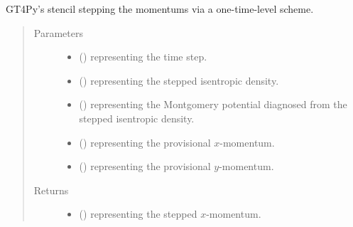 \documentclass[letterpaper,10pt,english]{sphinxmanual}
\begin{document}
\begin{fulllineitems}
\begin{fulllineitems}
\begin{quote}
\begin{description}
\begin{itemize}
\end{itemize}


\end{description}\end{quote}

\end{fulllineitems}


\begin{fulllineitems}
\label{\detokenize{api:dycore.prognostic_isentropic.PrognosticIsentropicTL1._defs_stencil_momentums}}
GT4Py’s stencil stepping the momentums via a one-time-level scheme.
\begin{quote}\begin{description}
\item[{Parameters}] \leavevmode\begin{itemize}
\item {} 
 () \textendash{}  representing the time step.

\item {} 
 () \textendash{}  representing the stepped isentropic density.

\item {} 
 () \textendash{}  representing the Montgomery potential diagnosed from the stepped isentropic density.

\item {} 
 () \textendash{}  representing the provisional \(x\)-momentum.

\item {} 
 () \textendash{}  representing the provisional \(y\)-momentum.

\end{itemize}

\item[{Returns}] \leavevmode
\begin{itemize}
\item {} 
 () \textendash{}  representing the stepped \(x\)-momentum.


\end{itemize}
\end{description}
\end{quote}
\end{fulllineitems}
\end{fulllineitems}
\end{document}
